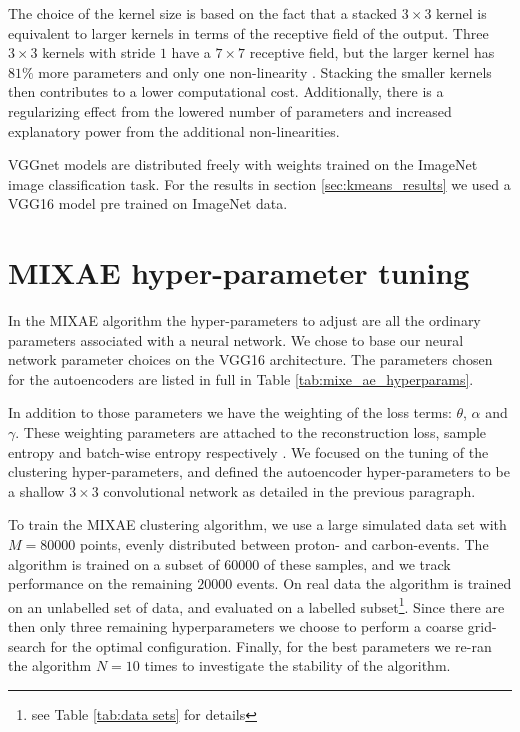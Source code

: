 \documentclass[preprint,12pt]{elsarticle}
\begin{document}
The choice of the kernel size is based on the fact that a stacked $3 \times 3$ kernel is equivalent to larger kernels in terms of the receptive field of the output. Three $3 \times 3$ kernels with stride $1$ have a $7 \times 7$ receptive field, but the larger kernel has $81\%$ more parameters and only one non-linearity \cite{Simonyan2014}. Stacking the smaller kernels then contributes to a lower computational cost. Additionally, there is a regularizing effect from the lowered number of parameters and increased explanatory power from the additional non-linearities.

VGGnet models are distributed freely with weights trained on the ImageNet \cite{deng2009imagenet} image classification task. For the results in section \ref{sec:kmeans_results} we used a VGG16 model pre trained on ImageNet data.

\section{MIXAE hyper-parameter tuning}\label{ax: mixae}

In the MIXAE algorithm the hyper-parameters to adjust are all the ordinary parameters associated with a neural network. We chose to base our neural network parameter choices on the VGG16 architecture. 
The parameters chosen for the autoencoders are listed in full in Table \ref{tab:mixe_ae_hyperparams}.

In addition to those parameters we have the weighting of the loss terms: $\theta$, $\alpha$ and $\gamma$. These weighting parameters are attached to the reconstruction loss, sample entropy and batch-wise entropy respectively \cite{Zhang}. 
We focused on the tuning of the clustering hyper-parameters, and defined the autoencoder hyper-parameters to be a shallow $3\times3$ convolutional network as detailed in the previous paragraph.  

To train the MIXAE clustering algorithm, we use a large simulated data set with $M=80000$ points, evenly distributed between proton- and carbon-events. The algorithm is trained on a subset of $60000$ of these samples, and we track performance on the remaining $20000$ events. On real data the algorithm is trained on an unlabelled set of data, and evaluated on a labelled subset\footnote{see Table \ref{tab:data sets} for details}. Since there are then only three remaining hyperparameters we choose to perform a coarse grid-search for the optimal configuration. Finally, for the best parameters we re-ran the algorithm $N=10$ times to investigate the stability of the algorithm.
\end{document}
